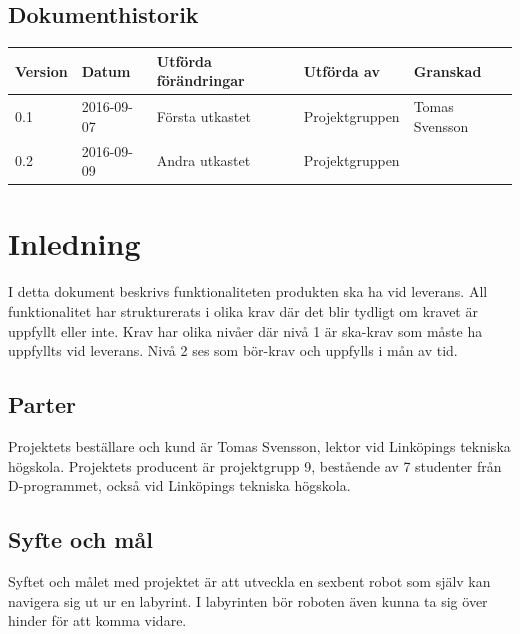 \documentclass[a4paper,titlepage,12pt]{article}
\begin{document}
\begin{center}

		\section*{Dokumenthistorik}
		\begin{table}[h]
			\begin{tabular}[pos]{| l | l | l | l | l |}
				\hline
				\textbf{Version} & \textbf{Datum} & \textbf{Utförda förändringar} 
				& \textbf{Utförda av} & \textbf{Granskad} \\ \hline

				0.1 & 2016-09-07 & Första utkastet & Projektgruppen & Tomas Svensson \\ \hline
				0.2  & 2016-09-09 & Andra utkastet & Projektgruppen & \\ \hline

			\end{tabular}
		\end{table}

	\end{center}


	\newpage

	\section{Inledning}
	I detta dokument beskrivs funktionaliteten produkten ska ha vid leverans. All funktionalitet har strukturerats i olika krav där det 
	blir tydligt om kravet är uppfyllt eller inte. Krav har olika nivåer där
	nivå 1 är ska-krav som måste ha uppfyllts vid leverans. Nivå 2 ses som bör-krav 
	och uppfylls i mån av tid.

	\subsection{Parter}
	Projektets beställare och kund är Tomas Svensson, lektor vid Linköpings tekniska högskola.
	Projektets producent är projektgrupp 9, bestående av 7 studenter från D-programmet, också vid 
	Linköpings tekniska högskola.
	\subsection{Syfte och mål}
	Syftet och målet med projektet är att utveckla en sexbent robot som själv
	kan navigera sig ut ur en labyrint. I labyrinten bör roboten även kunna ta 
	sig över hinder för att komma vidare. 
\end{document}
